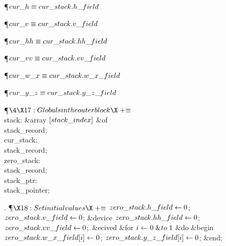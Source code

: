 \Y\P\D {}$\\{cur\_h}\S\\{cur\_stack}.\\{h\_field}$\par
\P\D {}$\\{cur\_v}\S\\{cur\_stack}.\\{v\_field}$\par
\P\D {}$\\{cur\_hh}\S\\{cur\_stack}.\\{hh\_field}$%
\par
\P\D {}$\\{cur\_vv}\S\\{cur\_stack}.\\{vv\_field}$%
\par
\P\D {}$\\{cur\_w\_x}\S\\{cur\_stack}.\\{w\_x\_field}$\par
\P\D {}$\\{cur\_y\_z}\S\\{cur\_stack}.\\{y\_z\_field}$\par
\Y\P$\4\X17:Globals in the outer block\X\mathrel{+}\S$\6
\4\\{stack}: \&{array} $[\\{stack\_index}]$ \1\&{of}\5
\\{stack\_record};\2\6
\4\\{cur\_stack}: \\{stack\_record};\6
\4\\{zero\_stack}: \\{stack\_record};\6
\4\\{stack\_ptr}: \\{stack\_pointer};\par
\fi

. \P$\X18:Set initial values\X\mathrel{+}\S$\6
$\\{zero\_stack}.\\{h\_field}\K0$;\5
$\\{zero\_stack}.\\{v\_field}\K0$;\6
\&{device} $\\{zero\_stack}.\\{hh\_field}\K0$;\5
$\\{zero\_stack}.\\{vv\_field}\K0$;\ \&{ecived}\6
\&{for} $\|i\K0\mathrel{\&{to}}1$ \1\&{do}\6
\&{begin} $\\{zero\_stack}.\\{w\_x\_field}[\|i]\K0$;\5
$\\{zero\_stack}.\\{y\_z\_field}[\|i]\K0$;\6
\&{end};\2\par
\fi

